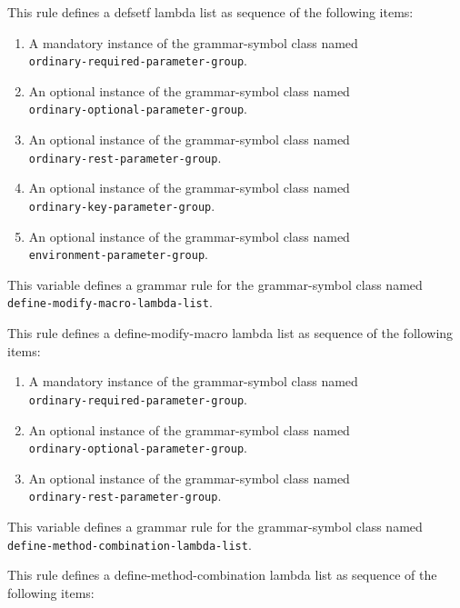 This rule defines a defsetf lambda list as sequence of the following
items:

\begin{enumerate}
\item A mandatory instance of the grammar-symbol class named\\
  \texttt{ordinary-required-parameter-group}.
\item An optional instance of the grammar-symbol class named\\
  \texttt{ordinary-optional-parameter-group}.
\item An optional instance of the grammar-symbol class named\\
\texttt{ordinary-rest-parameter-group}.
\item An optional instance of the grammar-symbol class named\\
\texttt{ordinary-key-parameter-group}.
\item An optional instance of the grammar-symbol class named\\
\texttt{environment-parameter-group}.
\end{enumerate}


This variable defines a grammar rule for the grammar-symbol class
named \texttt{define-modify-macro-lambda-list}.

This rule defines a define-modify-macro lambda list as sequence of the
following items:

\begin{enumerate}
\item A mandatory instance of the grammar-symbol class named\\
  \texttt{ordinary-required-parameter-group}.
\item An optional instance of the grammar-symbol class named\\
  \texttt{ordinary-optional-parameter-group}.
\item An optional instance of the grammar-symbol class named\\
\texttt{ordinary-rest-parameter-group}.
\end{enumerate}


This variable defines a grammar rule for the grammar-symbol class
named \texttt{define-method-combination-lambda-list}.

This rule defines a define-method-combination lambda list as sequence
of the following items:

